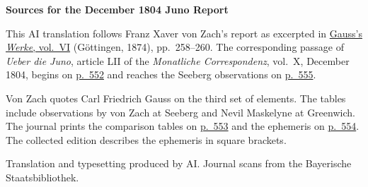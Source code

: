 \clearpage\thispagestyle{empty}
\begin{center}\textbf{Sources for the December 1804 Juno Report}\end{center}
\noindent This AI translation follows Franz Xaver von Zach’s report as excerpted in \href{https://gdz.sub.uni-goettingen.de/id/PPN236007467}{Gauss’s \textit{Werke}, vol.~VI} (Göttingen, 1874), pp.~258--260. The corresponding passage of \textit{Ueber die Juno}, article LII of the \textit{Monatliche Correspondenz}, vol.~X, December 1804, begins on \href{https://www.digitale-sammlungen.de/en/view/bsb10538602?page=566}{p.~552} and reaches the Seeberg observations on \href{https://www.digitale-sammlungen.de/en/view/bsb10538602?page=569}{p.~555}.
\par\smallskip\noindent Von Zach quotes Carl Friedrich Gauss on the third set of elements. The tables include observations by von Zach at Seeberg and Nevil Maskelyne at Greenwich. The journal prints the comparison tables on \href{https://www.digitale-sammlungen.de/en/view/bsb10538602?page=567}{p.~553} and the ephemeris on \href{https://www.digitale-sammlungen.de/en/view/bsb10538602?page=568}{p.~554}. The collected edition describes the ephemeris in square brackets.
\par\smallskip\noindent Translation and typesetting produced by AI. Journal scans from the Bayerische Staatsbibliothek.
\clearpage
